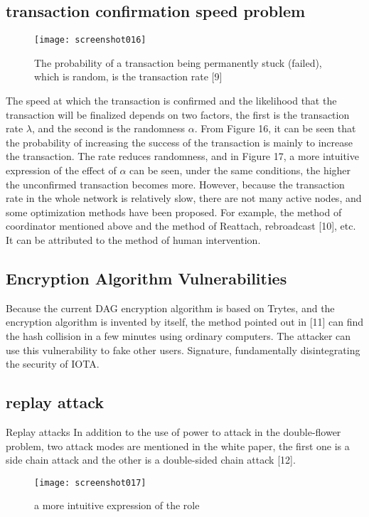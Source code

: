 \documentclass{article}
\begin{document}
\subsection{transaction confirmation speed problem}

\begin{figure}[H]
	\centering
	\texttt{[image: screenshot016]}
	\caption{The probability of a transaction being permanently stuck (failed), which is random, is the transaction rate [9]}
	\label{simulationfigure}
\end{figure}

The speed at which the transaction is confirmed and the likelihood that the transaction will be finalized depends on two factors, the first is the transaction rate $\lambda$, and the second is the randomness $\alpha$. From Figure 16, it can be seen that the probability of increasing the success of the transaction is mainly to increase the transaction. The rate reduces randomness, and in Figure 17, a more intuitive expression of the effect of $\alpha$ can be seen, under the same conditions, the higher the unconfirmed transaction becomes more. However, because the transaction rate in the whole network is relatively slow, there are not many active nodes, and some optimization methods have been proposed. For example, the method of coordinator mentioned above and the method of Reattach, rebroadcast [10], etc. It can be attributed to the method of human intervention.

\subsection{Encryption Algorithm Vulnerabilities}
Because the current DAG encryption algorithm is based on Trytes, and the encryption algorithm is invented by itself, the method pointed out in [11] can find the hash collision in a few minutes using ordinary computers. The attacker can use this vulnerability to fake other users. Signature, fundamentally disintegrating the security of IOTA.

\subsection{ replay attack}
Replay attacks In addition to the use of power to attack in the double-flower problem, two attack modes are mentioned in the white paper, the first one is a side chain attack and the other is a double-sided chain attack [12]. 

\begin{figure}[H]
	\centering
	\texttt{[image: screenshot017]}
	\caption{a more intuitive expression of the role}
	\label{simulationfigure}
\end{figure}
\end{document}
